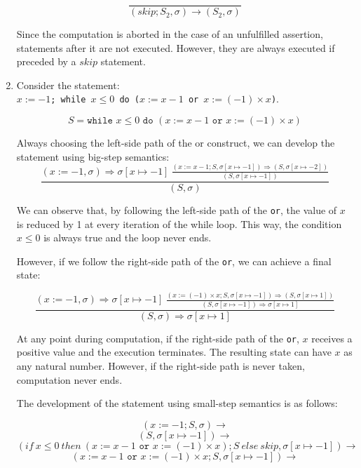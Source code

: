 \documentclass[11pt]{article}
\begin{document}
\begin{enumerate}
		\begin{equation}
			\frac{}{(skip; S_2,\sigma)\rightarrow (S_2,\sigma)}	
		\end{equation}

		Since the computation is aborted in the case of an unfulfilled assertion, statements after it are not executed. However, they are always executed if preceded by a $skip$ statement.
		
	\item Consider the statement:\\ \texttt{$x:= -1$; while $x\leq 0$ do ($x:=x-1$ or $x:= (-1)\times x$)}.
	
	\begin{equation}
		S = \texttt{while }x\leq 0\texttt{ do }(x:=x-1\texttt{ or }x:= (-1)\times x)
	\end{equation}
	
	Always choosing the left-side path of the or construct, we can develop the statement using big-step semantics:
	\begin{equation}
		\frac{(x:=-1,\sigma)\Rightarrow\sigma[x\mapsto-1]\ \frac{(x:=x-1; S,\sigma[x\mapsto -1])\Rightarrow(S,\sigma[x\mapsto -2])}{(S,\sigma[x\mapsto -1])}}{(S,\sigma)}
	\end{equation}
	
	We can observe that, by following the left-side path of the \texttt{or}, the value of $x$ is reduced by 1 at every iteration of the while loop. This way, the condition $x\leq 0$ is always true and the loop never ends.
	
	However, if we follow the right-side path of the \texttt{or}, we can achieve a final state:
	
	\begin{equation}
		\frac{(x:=-1,\sigma)\Rightarrow\sigma[x\mapsto-1]\ \frac{(x:=(-1)\times x; S,\sigma[x\mapsto -1])\Rightarrow(S,\sigma[x\mapsto 1])}{(S,\sigma[x\mapsto -1])\Rightarrow \sigma[x\mapsto 1]}}{(S,\sigma)\Rightarrow\sigma[x\mapsto 1]}
	\end{equation}
	
	At any point during computation, if the right-side path of the \texttt{or}, $x$ receives a positive value and the execution terminates. The resulting state can have $x$ as any natural number. However, if the right-side path is never taken, computation never ends.
	
	The development of the statement using small-step semantics is as follows:
	
		$$
		(x:=-1; S,\sigma) \rightarrow
		$$
		$$
		(S,\sigma[x\mapsto-1]) \rightarrow
		$$
		$$
		(if\ x\leq 0\ then\ (x:=x-1\texttt{ or }x:= (-1)\times x); S\ else\ skip,\sigma[x\mapsto-1]) \rightarrow
		$$
		$$
		(x:=x-1\texttt{ or }x:= (-1)\times x; S,\sigma[x\mapsto-1]) \rightarrow
		$$


\end{enumerate}
\end{document}
